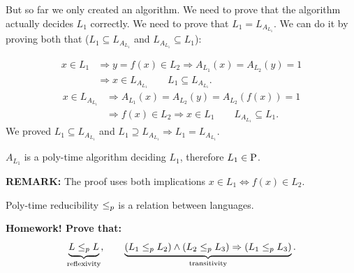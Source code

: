 
But so far we only created an algorithm. We need to prove that the algorithm actually decides $L_1$ correctly. We need to prove that $L_1=L_{A_{L_1}}$.
We can do it by proving both that  ($L_1 \subseteq L_{A_{L_1}}$ and $L_{A_{L_1}} \subseteq L_1$):


\[
\begin{aligned}
x\in L_1&\Rightarrow y=f(x)\in L_2\Rightarrow A_{L_1}(x)=A_{L_2}(y)=1\\
&\Rightarrow x\in L_{A_{L_1}}\qquad L_1\subseteq L_{A_{L_1}}.
\end{aligned}
\]
\[
\begin{aligned}
x\in L_{A_{L_1}}&\Rightarrow A_{L_1}(x)=A_{L_2}(y)=A_{L_2}(f(x))=1\\
&\Rightarrow f(x)\in L_2\Rightarrow x\in L_1\qquad L_{A_{L_1}}\subseteq L_1.
\end{aligned}
\]
We proved $L_1\subseteq L_{A_{L_1}}$ and $L_1\supseteq L_{A_{L_1}}\Rightarrow L_1=L_{A_{L_1}}$.

$A_{L_1}$ is a poly-time algorithm deciding $L_1$, therefore $L_1\in\mathrm{P}$.

\textbf{REMARK:} The proof uses both implications $x\in L_1\Longleftrightarrow f(x)\in L_2$.

Poly-time reducibility $\leq_p$ is a relation between languages.

\textbf{Homework! Prove that:}
\[
\underbrace{L\leq_p L}_{\text{reflexivity}},\qquad
\underbrace{(L_1\leq_p L_2)\land(L_2\leq_p L_3)\Rightarrow(L_1\leq_p L_3)}_{\text{transitivity}}.
\]
